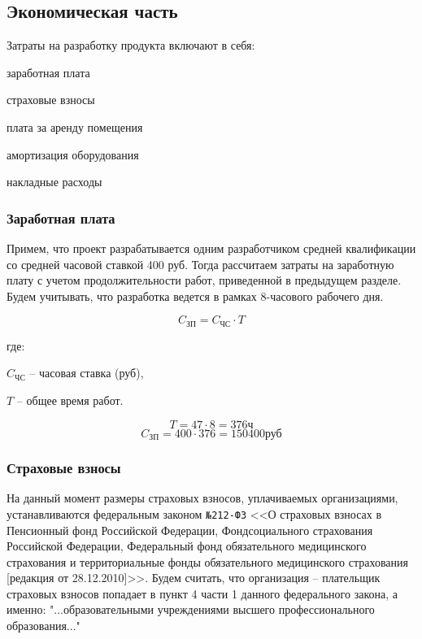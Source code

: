 \subsection{Экономическая часть}

Затраты на разработку продукта включают в себя:

\begin{mintemize}
\item заработная плата
\item страховые взносы
\item плата за аренду помещения
\item амортизация оборудования
\item накладные расходы
\end{mintemize}

\subsubsection{Заработная плата}

Примем, что проект разрабатывается одним разработчиком средней
квалификации со средней часовой ставкой 400 руб.
Тогда рассчитаем затраты на заработную плату с учетом
продолжительности работ, приведенной в предыдущем разделе. Будем
учитывать, что разработка ведется в рамках 8-часового рабочего дня.

$$ C_\text{ЗП} = C_\text{ЧС} \cdot T $$

где:

$C_\text{ЧС}$ -- часовая ставка (руб),

$T$ -- общее время работ.

$$ T = 47 \cdot 8 = 376 \text{ч} $$
$$ C_\text{ЗП} = 400 \cdot 376 = 150400 \text{руб} $$

\subsubsection{Страховые взносы}

На данный момент размеры страховых взносов, уплачиваемых
организациями, устанавливаются федеральным законом \verb|№212-ФЗ| <<О
страховых взносах в Пенсионный фонд Российской Федерации, Фондсоциального страхования Российской Федерации, Федеральный фонд
обязательного медицинского страхования и территориальные фонды
обязательного медицинского страхования [редакция от 28.12.2010]>>.
Будем считать, что организация -- плательщик страховых взносов
попадает в пункт 4 части 1 данного федерального закона, а именно:
"...образовательными учреждениями высшего профессионального образования..."

